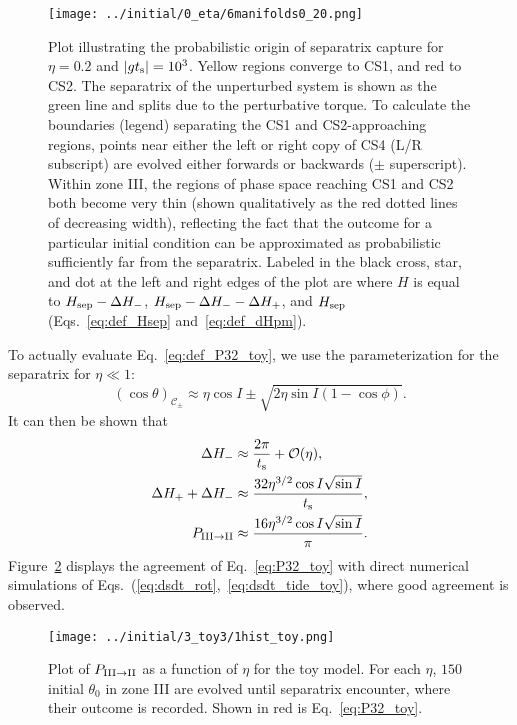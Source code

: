 \documentclass[
        fleqn,
        usenatbib,
    ]{mnras}
\newcommand*{\abs}[1]{\left|#1\right|}
\newcommand*{\p}[1]{\left(#1\right)}
\begin{document}
\begin{figure}
    \centering
    \texttt{[image: ../initial/0\_eta/6manifolds0\_20.png]}
    \caption{Plot illustrating the probabilistic origin of separatrix capture
    for $\eta = 0.2$ and $\abs{gt_{\rm s}} = 10^3$. Yellow regions converge to CS1,
    and red to CS2. The separatrix of the unperturbed system is shown as the
    green line and splits due to the perturbative torque. To calculate the
    boundaries (legend) separating the CS1 and CS2-approaching regions, points
    near either the left or right copy of CS4 (L/R subscript) are evolved either
    forwards or backwards ($\pm$ superscript). Within zone III, the regions of
    phase space reaching CS1 and CS2 both become very thin (shown qualitatively
    as the red dotted lines of decreasing width), reflecting the fact that the
    outcome for a particular initial condition can be approximated as
    probabilistic sufficiently far from the separatrix. Labeled in the black
    cross, star, and dot at the left and right edges of the plot are where $H$
    is equal to $H_{\rm sep} - \Delta H_-$, $H_{\rm sep} - \Delta H_- - \Delta
    H_+$, and $H_{\rm sep}$ (Eqs.~\ref{eq:def_Hsep} and~\ref{eq:def_dHpm}).
    }\label{fig:toy_hop_manifolds}
\end{figure}

To actually evaluate Eq.~\eqref{eq:def_P32_toy}, we use the parameterization for
the separatrix \citep{su2020} for $\eta \ll 1$:
\begin{equation}
    \p{\cos \theta}_{\mathcal{C}_{\pm}} \approx
        \eta \cos I \pm \sqrt{2\eta\sin I\p{1 - \cos \phi}}.
        \label{eq:sep_theta}
\end{equation}
It can then be shown that
\begin{align}
    \Delta H_- &\approx \frac{2\pi}{t_{\rm s}} + \mathcal{O}(\eta),\\
    \Delta H_+ + \Delta H_- &\approx
        \frac{32 \eta^{3/2}\cos I \sqrt{\sin I}}{t_{\rm s}},\\
    P_{\rm III \to II} &\approx
        \frac{16 \eta^{3/2} \cos I \sqrt{\sin I}}{\pi}.\label{eq:P32_toy}
\end{align}
Figure~\ref{fig:1hist_toy} displays the agreement of Eq.~\eqref{eq:P32_toy} with
direct numerical simulations of
Eqs.~(\ref{eq:dsdt_rot},~\ref{eq:dsdt_tide_toy}), where good agreement is
observed.
\begin{figure}
    \centering
    \texttt{[image: ../initial/3\_toy3/1hist\_toy.png]}
    \caption{Plot of $P_{\rm III \to II}$ as a function of $\eta$ for the toy
    model. For each $\eta$, $150$ initial $\theta_0$ in zone III are evolved
    until separatrix encounter, where their outcome is recorded. Shown in red is
    Eq.~\eqref{eq:P32_toy}.}\label{fig:1hist_toy}
\end{figure}
\end{document}
